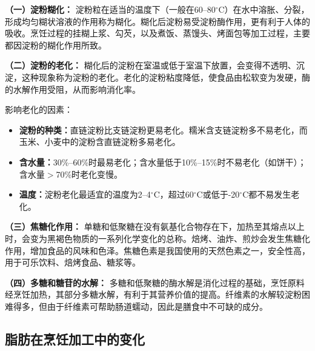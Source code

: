 \begin{tipbox}
\textbf{（一）淀粉糊化：}%
淀粉粒在适当的温度下（一般在60--80$^\circ$C）在水中溶胀、分裂，形成均匀糊状溶液的作用称为糊化。糊化后淀粉易受淀粉酶作用，更有利于人体的吸收。烹饪过程的挂糊上浆、勾芡，以及煮饭、蒸馒头、烤面包等加工过程，主要都因淀粉的糊化作用所致。

\textbf{（二）淀粉的老化：}
糊化后的淀粉在室温或低于室温下放置，会变得不透明、沉淀，这种现象称为淀粉的老化。老化的淀粉粘度降低，使食品由松软变为发硬，酶的水解作用受阻，从而影响消化率。

影响老化的因素：
\begin{itemize}[leftmargin=*]
    \item \textbf{淀粉的种类：}直链淀粉比支链淀粉更易老化。糯米含支链淀粉多不易老化，而玉米、小麦中的淀粉含直链淀粉多易老化。
    \item \textbf{含水量：}30\%--60\%时最易老化；含水量低于10\%--15\%时不易老化（如饼干）；含水量$>$70\%时老化变慢。
    \item \textbf{温度：}淀粉老化最适宜的温度为2--4$^\circ$C，超过60$^\circ$C或低于-20$^\circ$C都不易发生老化。
\end{itemize}

\textbf{（三）焦糖化作用：}
单糖和低聚糖在没有氨基化合物存在下，加热至其熔点以上时，会变为黑褐色物质的一系列化学变化的总称。焙烤、油炸、煎炒会发生焦糖化作用，增加食品的风味和色泽。焦糖色素是我国使用的天然色素之一，安全性高，用于可乐饮料、焙烤食品、糖浆等。

\textbf{（四）多糖和糖苷的水解：}
多糖和低聚糖的酶水解是消化过程的基础，烹饪原料经烹饪加热，其部分多糖水解，有利于其营养价值的提高。纤维素的水解较淀粉困难得多，但由于纤维素可帮助肠道蠕动，因此是膳食中不可缺的成分。
\end{tipbox}

\subsection{脂肪在烹饪加工中的变化}

